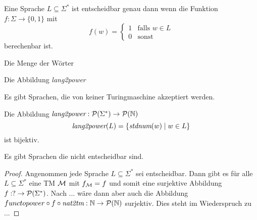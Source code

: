 \begin{Satz}
    Eine Sprache $L\subseteq\Sigma^*$ ist entscheidbar genau dann wenn die Funktion
    $f:\Sigma\rightarrow\{0,1\}$ mit 
    $$f(w)=\begin{cases}
       1 & \text{falls } w\in L\\
       0 & \text{sonst}
      \end{cases}$$
    berechenbar ist.
\end{Satz}


\begin{lemma}
Die Menge der Wörter
\end{lemma}

\begin{lemma}
Die Abbildung \textit{lang2power}
\end{lemma}



\begin{Satz}
Es gibt Sprachen, die von keiner Turingmaschine akzeptiert werden.
\end{Satz}


\begin{lemma}
Die Abbildung $\textit{lang2power}:\mathcal{P}(\Sigma^*)\rightarrow \mathcal{P}(\mathbb{N})$
$$\textit{lang2power}(L)=\{\textit{stdnum}(w)\mid w\in L\}$$
ist bijektiv.
\end{lemma}


\begin{Satz}
 Es gibt Sprachen die nicht entscheidbar sind.
\end{Satz}
\begin{proof}
 Angenommen jede Sprache $L\subseteq\Sigma^*$ sei entscheidbar.
 Dann gibt es für alle $L\subseteq\Sigma^*$ eine \ac{TM} $\mathcal{M}$ mit $f_{\mathcal{M}}=f$ und somit eine surjektive Abbildung $f:?\rightarrow\mathcal{P}(\Sigma^*)$.
 Nach ... wäre dann aber auch die Abbildung $functopower\circ f \circ\textit{nat2tm}:\mathbb{N}\rightarrow\mathcal{P}(\mathbb{N})$ surjektiv.
 Dies steht im Wiederspruch zu ...
\end{proof}



